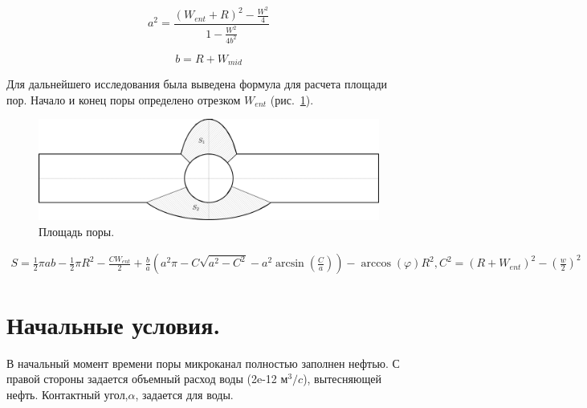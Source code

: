 \documentclass[14pt,a4paper]{article}
\begin{document}
    \begin{equation}\label{eqn:a}
        a^2 = \frac{(W_{ent} + R)^2 - \frac{W^2}{4}}{1 - \frac{W^2}{4  b^2}}
    \end{equation}  
    
    \begin{equation}
        b = R + W_{mid}
    \end{equation}
    
    Для дальнейшего исследования была выведена формула для расчета площади пор. Начало и конец поры определено отрезком $W_{ent}$ (рис.~\ref{fig:HSarea}).
    
    \begin{figure}[H]
        \centering
        \includegraphics[width = 1\linewidth]{GeomArea}
        \caption{Площадь поры.}
        \label{fig:HSarea}
    \end{figure}
    
    \begin{equation}
    \begin{split}    
            S = \frac{1}{2} \pi ab - \frac{1}{2} \pi R^2 - \frac{C W_{ent}}{2} + \frac{b}{a}\left( a^2\pi - C\sqrt{a^2 - C^2} - a^2\arcsin(\frac{C}{a}) \right) - \arccos(\varphi)R^2,  C^2 = (R + W_{ent})^2 - (\frac{w}{2})^2 
    \end{split}
    \end{equation}
    
    \section*{Начальные условия.}
    
    В начальный момент времени поры микроканал полностью заполнен нефтью. С правой стороны задается объемный расход воды (2e-12 м$^3/c$), вытесняющей нефть. Контактный угол,$\alpha$, задается для воды. 
    
\end{document}
